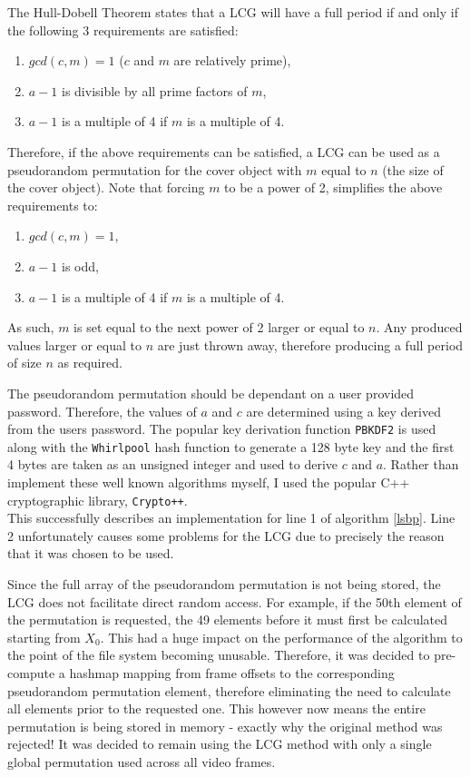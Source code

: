\documentclass[paper=a4, fontsize=11pt,twoside]{scrartcl}    %
\numberwithin{table}{section}
\numberwithin{figure}{section}
\numberwithin{algorithm}{section}
\begin{document}
\noindent
The Hull-Dobell Theorem states that a LCG will have a full period if and only if the following 3 requirements are satisfied:
\begin{enumerate}
	\item $gcd(c, m) = 1$ ($c$ and $m$ are relatively prime),
	\item $a-1$ is divisible by all prime factors of $m$,
	\item $a-1$ is a multiple of 4 if $m$ is a multiple of 4.
\end{enumerate}

\noindent
Therefore, if the above requirements can be satisfied, a LCG can be used as a pseudorandom permutation for the cover object with $m$ equal to $n$ (the size of the cover object). Note that forcing $m$ to be a power of 2, simplifies the above requirements to:
\begin{enumerate}
	\item $gcd(c, m) = 1$,
	\item $a-1$ is odd,
	\item $a-1$ is a multiple of 4 if $m$ is a multiple of 4.
\end{enumerate}

\noindent
As such, $m$ is set equal to the next power of 2 larger or equal to $n$. Any produced values larger or equal to $n$ are just thrown away, therefore producing a full period of size $n$ as required.

The pseudorandom permutation should be dependant on a user provided password. Therefore, the values of $a$ and $c$ are determined using a key derived from the users password. The popular key derivation function \texttt{PBKDF2} is used along with the \texttt{Whirlpool} hash function to generate a 128 byte key and the first 4 bytes are taken as an unsigned integer and used to derive $c$ and $a$. Rather than implement these well known algorithms myself, I used the popular C++ cryptographic library, \texttt{Crypto++}.\\

\noindent
This successfully describes an implementation for line 1 of algorithm \ref{lsbp}. Line 2 unfortunately causes some problems for the LCG due to precisely the reason that it was chosen to be used.

Since the full array of the pseudorandom permutation is not being stored, the LCG does not facilitate direct random access. For example, if the 50th element of the permutation is requested, the 49 elements before it must first be calculated starting from $X_{0}$. This had a huge impact on the performance of the algorithm to the point of the file system becoming unusable. Therefore, it was decided to pre-compute a hashmap mapping from frame offsets to the corresponding pseudorandom permutation element, therefore eliminating the need to calculate all elements prior to the requested one. This however now means the entire permutation is being stored in memory - exactly why the original method was rejected! It was decided to remain using the LCG method with only a single global permutation used across all video frames.
\end{document}
